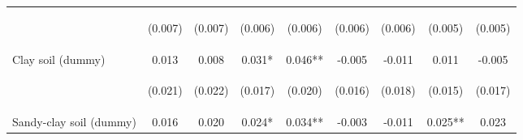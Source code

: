 \begin{center}
\begin{tabular}{lcccccccc}
\vspace{4pt} & \begin{footnotesize}(0.007)\end{footnotesize} & \begin{footnotesize}(0.007)\end{footnotesize} & \begin{footnotesize}(0.006)\end{footnotesize} & \begin{footnotesize}(0.006)\end{footnotesize} & \begin{footnotesize}(0.006)\end{footnotesize} & \begin{footnotesize}(0.006)\end{footnotesize} & \begin{footnotesize}(0.005)\end{footnotesize} & \begin{footnotesize}(0.005)\end{footnotesize} \\
Clay soil (dummy) & 0.013 & 0.008 & 0.031* & 0.046** & -0.005 & -0.011 & 0.011 & -0.005 \\
\vspace{4pt} & \begin{footnotesize}(0.021)\end{footnotesize} & \begin{footnotesize}(0.022)\end{footnotesize} & \begin{footnotesize}(0.017)\end{footnotesize} & \begin{footnotesize}(0.020)\end{footnotesize} & \begin{footnotesize}(0.016)\end{footnotesize} & \begin{footnotesize}(0.018)\end{footnotesize} & \begin{footnotesize}(0.015)\end{footnotesize} & \begin{footnotesize}(0.017)\end{footnotesize} \\
Sandy-clay soil (dummy) & 0.016 & 0.020 & 0.024* & 0.034** & -0.003 & -0.011 & 0.025** & 0.023 \\

\end{tabular}
\end{center}
